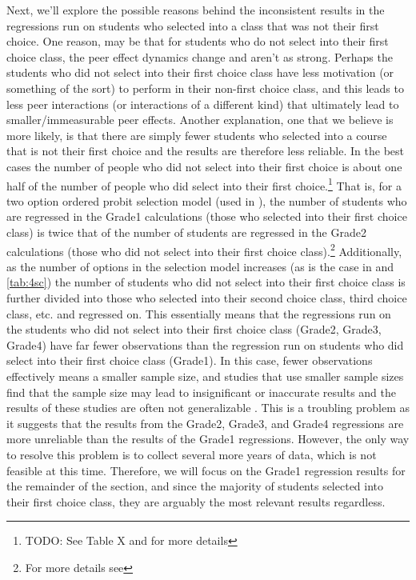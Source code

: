 Next, we'll explore the possible reasons behind the inconsistent results in the regressions run on students who selected into a class that was not their first choice. 
One reason, may be that for students who do not select into their first choice class, the peer effect dynamics change and aren't as strong. 
Perhaps the students who did not select into their first choice class have less motivation (or something of the sort) to perform in their non-first choice class, and this leads to less peer interactions (or interactions of a different kind) that ultimately lead to smaller/immeasurable peer effects. 
Another explanation, one that we believe is more likely, is that there are simply fewer students who selected into a course that is not their first choice and the results are therefore less reliable. 
In the best cases the number of people who did not select into their first choice is about one half of the number of people who did select into their first choice.\footnote{TODO: See Table X and  for more details} 
That is, for a two option ordered probit selection model (used in ), the number of students who are regressed in the Grade1 calculations (those who selected into their first choice class) is twice that of the number of students are regressed in the Grade2 calculations (those who did not select into their first choice class).\footnote{For more details see } 
Additionally, as the number of options in the selection model increases (as is the case in  and \ref{tab:4sc}) the number of students who did not select into their first choice class is further divided into those who selected into their second choice class, third choice class, etc. and regressed on. 
This essentially means that the regressions run on the students who did not select into their first choice class (Grade2, Grade3, Grade4) have far fewer observations than the regression run on students who did select into their first choice class (Grade1). 
In this case, fewer observations effectively means a smaller sample size, and studies that use smaller sample sizes find that the sample size may lead to insignificant or inaccurate results \citep{gonzalez2013gibrat} and the results of these studies are often not generalizable \citep{oladipupo2013does}.
This is a troubling problem as it suggests that the results from the Grade2, Grade3, and Grade4 regressions are more unreliable than the results of the Grade1 regressions. 
However, the only way to resolve this problem is to collect several more years of data, which is not feasible at this time. 
Therefore, we will focus on the Grade1 regression results for the remainder of the section, and since the majority of students selected into their first choice class, they are arguably the most relevant results regardless. 

